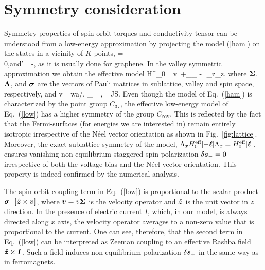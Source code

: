 \section{Symmetry consideration} 

Symmetry properties of spin-orbit torques and conductivity tensor can be understood from a low-energy approximation by projecting the model (\ref{ham}) on the states in a vicinity of $K$ points, 
\be
{}= \\ 0\epm,\quad\mbox{and}\quad {}'= -,
\e
as it is usually done for graphene. In the valley symmetric approximation we obtain the effective model
\be
\label{low}
H^_0= v\, \cdot\bb{\Sigma}+\alpha_\lt[\bb{\sigma}\times\bb{\Sigma}\rt]_{} - \Delta\,\bb{\ell}\cdot\bb{\sigma}\,\Sigma_z\Lambda_z,
\e
where $\boldsymbol{\Sigma}$, $\boldsymbol{\Lambda}$, and $\boldsymbol{\sigma}$ are the vectors of Pauli matrices in sublattice, valley and spin space, respectively, and 
\be
v=  wa/\hbar, \qquad \alpha_=  \lambda , \qquad \Delta=JS.
\e
Even though the model of Eq.~(\ref{ham}) is characterized by the point group $C_\text{3v}$, the effective low-energy model of Eq.~(\ref{low}) has a higher symmetry 
of the group $C_{\infty\text{v}}$. This is reflected by the fact that the Fermi-surfaces (for energies we are interested in) remain entirely isotropic irrespective of the N\'eel vector orientation as shown in Fig.~\ref{fig:lattice}. Moreover, the exact sublattice symmetry of the model, $\Lambda_x H^\text{eff}_0[-\boldsymbol{\ell}] \Lambda_x =H^\text{eff}_0[\boldsymbol{\ell}]$, ensures vanishing non-equilibrium staggered spin polarization $\delta \boldsymbol{s}_-=0$ irrespective of both the voltage bias and the N\'eel vector orientation. This property is indeed confirmed by the numerical analysis. 

The spin-orbit coupling term in Eq.~(\ref{low}) is proportional to the scalar product $\boldsymbol{\sigma}\cdot \left[\hat{\boldsymbol{z}}\times \boldsymbol{v}\right]$, where $\boldsymbol{v}=v\boldsymbol{\Sigma}$ is the velocity operator and $\hat{\boldsymbol{z}}$ is the unit vector in $z$ direction. In the presence of electric current $I$, which, in our model, is always directed along $x$ axis, the velocity operator averages to a non-zero value that is proportional to the current. One can see, therefore, that the second term in Eq.~(\ref{low}) can be interpreted as Zeeman coupling to an effective Rashba field $\hat{\boldsymbol{z}}\times \boldsymbol{I}$. Such a field induces non-equilibrium polarization $\delta\boldsymbol{s}_+$ in the same way as in ferromagnets. 

